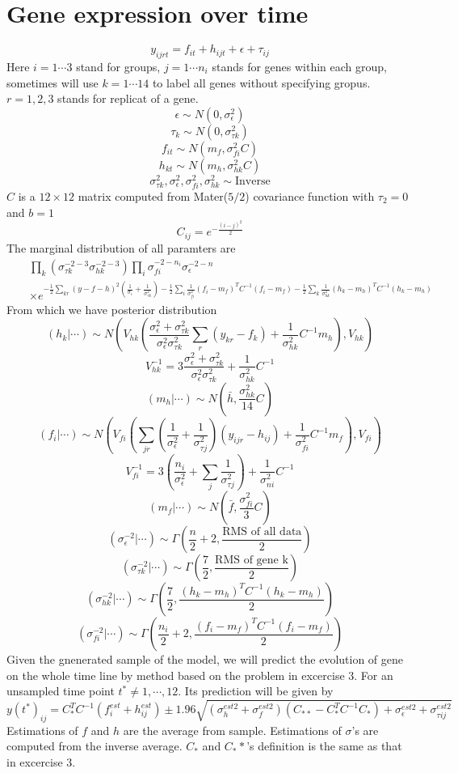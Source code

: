 \documentclass{article}
\begin{document}
\section{Gene expression over time}
\[
y_{ijrt}=f_{it}+h_{ijt}+\epsilon+\tau_{ij}
\]
Here $i=1\cdots 3$ stand for groups, $j=1\cdots n_i$ stands for genes within each group, sometimes will use $k=1\cdots 14$ to label all genes without specifying gropus. $r=1,2,3$ stands for replicat of a gene.
\[
\epsilon\sim N(0,\sigma_\epsilon^2)
\]
\[
\tau_k\sim N(0,\sigma_{\tau k}^2)
\]
\[
f_{it}\sim N(m_f,\sigma^2_{fi}C)
\]
\[
h_{kt}\sim N(m_h,\sigma^2_{hk}C)
\]
\[
\sigma_{\tau k}^2,\sigma_{\epsilon}^2,\sigma_{fi}^2,\sigma_{hk}^2\sim \textrm{Inverse}
\]
$C$ is a $12\times 12$ matrix computed from Mater($5/2$) covariance function with $\tau_2=0$ and $b=1$
\[
C_{ij}=e^{-\frac{(i-j)^2}{2}}
\]
The marginal distribution of all paramters are
\begin{eqnarray}
&&\prod_k(\sigma_{\tau k}^{-2-3}\sigma_{hk}^{-2-3})\prod_i\sigma_{fi}^{-2-n_i}\sigma_\epsilon^{-2-n}\nonumber\\
&&\times e^{-\frac{1}{2}\sum_{kr}(y-f-h)^2(\frac{1}{\sigma_\epsilon}+\frac{1}{\sigma_{\tau k}^2})-\frac{1}{2}\sum_i\frac{1}{\sigma_{fi}^2}(f_i-m_f)^TC^{-1}(f_i-m_f)-\frac{1}{2}\sum_k\frac{1}{\sigma_{hk}^2}(h_k-m_h)^TC^{-1}(h_k-m_h)}
\end{eqnarray}
From which we have posterior distribution
\[
(h_k|\cdots)\sim N(V_{hk}(\frac{\sigma_\epsilon^2+\sigma_{\tau k}^2}{\sigma_\epsilon^2\sigma_{\tau k}^2}\sum_r(y_{kr}-f_k)+\frac{1}{\sigma_{hk}^2}C^{-1}m_h),V_{hk})
\]
\[
V_{hk}^{-1}=3\frac{\sigma_\epsilon^2+\sigma_{\tau k}^2}{\sigma_\epsilon^2\sigma_{\tau k}^2}+\frac{1}{\sigma_{hk}^2}C^{-1}
\]
\[
(m_h|\cdots)\sim N(\bar{h},\frac{\sigma_{hk}^2}{14}C)
\]
\[
(f_i|\cdots)\sim N(V_{fi}(\sum_{jr}(\frac{1}{\sigma_\epsilon^2}+\frac{1}{\sigma_{\tau j}^2})(y_{ijr}-h_{ij})+\frac{1}{\sigma_{fi}^2}C^{-1}m_f),V_{fi})
\]
\[
V_{fi}^{-1}=3(\frac{n_i}{\sigma_\epsilon^2}+\sum_j\frac{1}{\sigma_{\tau j}^2})+\frac{1}{\sigma_{ni}^2}C^{-1}
\]
\[
(m_f|\cdots)\sim N(\bar{f},\frac{\sigma_{fi}^2}{3}C)
\]
\[
(\sigma_\epsilon^{-2}|\cdots)\sim \Gamma(\frac{n}{2}+2,\frac{\textrm{RMS of all data}}{2})
\]
\[
(\sigma_{\tau k}^{-2}|\cdots)\sim\Gamma(\frac{7}{2},\frac{\textrm{RMS of gene k}}{2})
\]
\[
(\sigma_{hk}^{-2}|\cdots)\sim\Gamma(\frac{7}{2},\frac{(h_k-m_h)^TC^{-1}(h_k-m_h)}{2})
\]
\[
(\sigma_{fi}^{-2}|\cdots)\sim\Gamma(\frac{n_i}{2}+2,\frac{(f_i-m_f)^TC^{-1}(f_i-m_f)}{2})
\]
Given the gnenerated sample of the model, we will predict the evolution of gene on the whole time line by method based on the problem in excercise 3. For an unsampled time point $t^*\neq 1,\cdots,12$. Its prediction will be given by
\[
y(t^*)_{ij}=C_*^TC^{-1}(f_i^{est}+h_{ij}^{est})\pm1.96\sqrt{(\sigma_h^{est2}+\sigma_f^{est2})(C_{**}-C_*^TC^{-1}C_*)+\sigma_\epsilon^{est2}+\sigma_{\tau ij}^{est2}}
\]
Estimations of $f$ and $h$ are the average from sample. Estimations of $\sigma$'s are computed from the inverse average. $C_*$ and $C_**$'s definition is the same as that in excercise 3.
\end{document}
